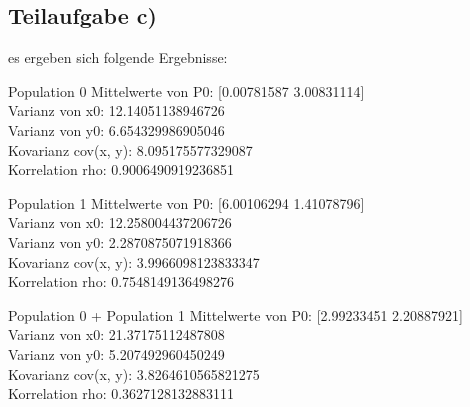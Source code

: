 \subsection{Teilaufgabe c)}
es ergeben sich folgende Ergebnisse:
\begin{console1}{Population 0}
  Mittelwerte von P0:  [0.00781587 3.00831114] \\
  Varianz von x0:  12.14051138946726 \\
  Varianz von y0:  6.654329986905046 \\
  Kovarianz cov(x, y):  8.095175577329087 \\
  Korrelation rho:  0.9006490919236851
\end{console1}

\begin{console1}{Population 1}
  Mittelwerte von P0:  [6.00106294 1.41078796] \\
  Varianz von x0:  12.258004437206726 \\
  Varianz von y0:  2.2870875071918366 \\
  Kovarianz cov(x, y):  3.9966098123833347 \\
  Korrelation rho:  0.7548149136498276
\end{console1}

\begin{console1}{Population 0 + Population 1}
  Mittelwerte von P0:  [2.99233451 2.20887921] \\
  Varianz von x0:  21.37175112487808 \\
  Varianz von y0:  5.207492960450249 \\
  Kovarianz cov(x, y):  3.8264610565821275 \\
  Korrelation rho:  0.3627128132883111 
\end{console1}
